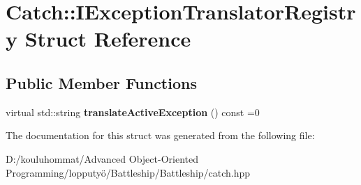 \hypertarget{struct_catch_1_1_i_exception_translator_registry}{}\section{Catch\+:\+:I\+Exception\+Translator\+Registry Struct Reference}
\label{struct_catch_1_1_i_exception_translator_registry}
\subsection*{Public Member Functions}
\begin{DoxyCompactItemize}
\item 
\mbox{\label{struct_catch_1_1_i_exception_translator_registry_af76ae8c331a17f2a94c9720bc0d686bb}} 
virtual std\+::string {\bfseries translate\+Active\+Exception} () const =0
\end{DoxyCompactItemize}


The documentation for this struct was generated from the following file\+:\begin{DoxyCompactItemize}
\item 
D\+:/kouluhommat/\+Advanced Object-\/\+Oriented Programming/lopputyö/\+Battleship/\+Battleship/catch.\+hpp\end{DoxyCompactItemize}
